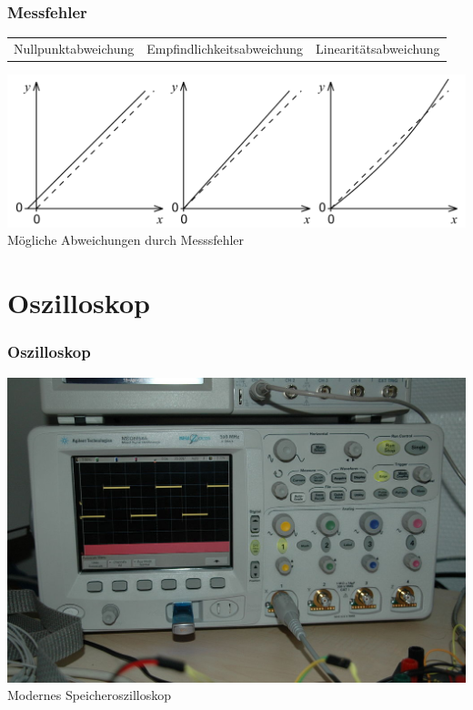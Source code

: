 \begin{frame}
  \frametitle{Messfehler}
  \begin{center}
    \begin{tabular}{ccc}
      Nullpunktabweichung & Empfindlichkeitsabweichung & Linearitätsabweichung
    \end{tabular}
    \includegraphics[width=1\textwidth,height=.6\textheight]{a16/werMisstMisst.png}\\
    {\tiny Mögliche Abweichungen durch Messsfehler \href{refs}{\cite{wmde}}}
  \end{center}
\end{frame}

\section*{Oszilloskop}


\begin{frame}
  \frametitle{Oszilloskop}
  \begin{center}
    \includegraphics[width=1\textwidth,height=.8\textheight,keepaspectratio]{a16/osziModern.jpg}\\
    {\tiny Modernes Speicheroszilloskop \href{refs}{\cite{wmde}}}
  \end{center}
\end{frame}

